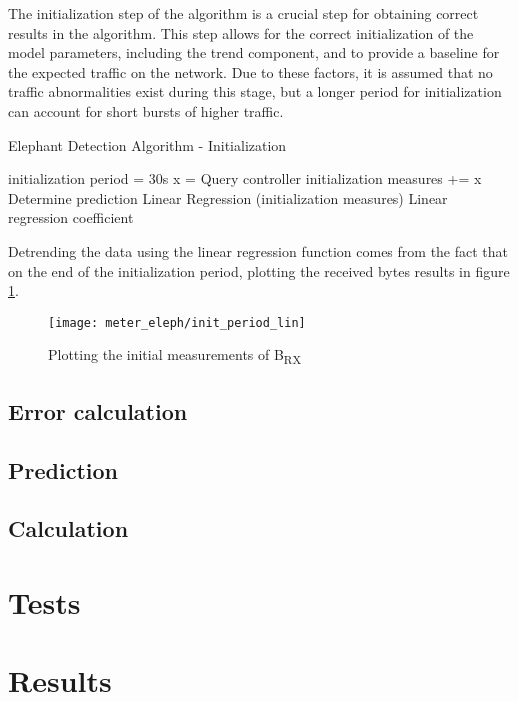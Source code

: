The initialization step of the algorithm is a crucial step for obtaining correct results in the algorithm. This step allows for the correct initialization of the model parameters, including the trend component, and to provide a 
baseline for the expected traffic on the network. Due to these factors, it is assumed that no traffic abnormalities exist during this stage, but a longer period for initialization can account for short bursts of higher traffic.

\begin{algorithm}[H]
    \caption{Elephant Detection Algorithm - Initialization} \label{alg:high_level}
    \begin{algorithmic}[1]
            \State initialization period = 30s
                \State x = Query controller
                \State initialization measures += x
                \State Determine prediction
            \EndWhile
            \State Linear Regression (initialization measures)
        \State \Return Linear regression coefficient
    \end{algorithmic}
\end{algorithm}

\par Detrending the data using the linear regression function comes from the fact that on the end of the initialization period, plotting the received bytes results in figure \ref{fig:init_plot}.

\begin{figure} 
    \centering
    \texttt{[image: meter\_eleph/init\_period\_lin]}
    \caption {Plotting the initial measurements of B\textsubscript{RX}}
    \label{fig:init_plot}
\end{figure} 

\subsection{Error calculation}

\subsection{Prediction}

\subsection{Calculation}


\section {Tests}
\section {Results}

